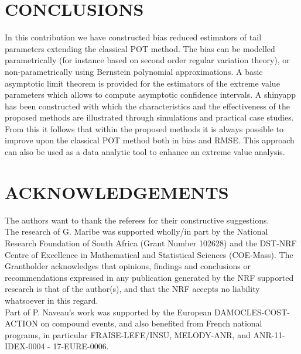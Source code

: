 \documentclass[twoside,leqno,11pt]{article}
\begin{document}
\section{CONCLUSIONS} 

In this contribution we have constructed bias reduced estimators of tail parameters extending the classical POT method. The bias can be modelled parametrically (for instance based on second order regular variation theory), or non-parametrically using Bernstein polynomial approximations. A basic asymptotic limit theorem is provided for the estimators of the extreme value parameters which allows to compute asymptotic confidence intervals. A shinyapp has been constructed with which  the characteristics and the effectiveness of the proposed methods are illustrated  through simulations and practical case studies. From this it follows that within the proposed methods it is always possible to improve upon the classical POT method both in bias and RMSE. This approach can also be used as a data analytic tool to enhance an extreme value analysis. 


\section{ACKNOWLEDGEMENTS}
\label{Sec5}
	\noindent The authors want to thank the referees for their constructive suggestions. \\ The research of G. Maribe was supported wholly/in part by the National Research Foundation of South Africa (Grant Number 102628) and the DST-NRF Centre of Excellence in Mathematical and Statistical Sciences (COE-Mass). The Grantholder acknowledges that opinions, findings and conclusions or recommendations expressed in any publication generated by the NRF supported research is that of the author(s), and that the NRF accepts no liability whatsoever in this regard. \\
	Part of P. Naveau's work was supported by the European   DAMOCLES-COST-ACTION on compound events, and also  benefited from  French national programs, in particular    FRAISE-LEFE/INSU,  MELODY-ANR,  and  ANR-11-IDEX-0004 - 17-EURE-0006.
\end{document}
